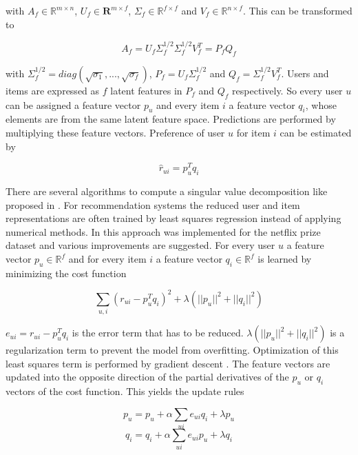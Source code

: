 \documentclass[10pt]{reportMaster}
\begin{document}
with $A_f \in \mathds{R}^{m \times n}$, $U_f \in \mathbf{R}^{m \times f}$, $\Sigma_f \in \mathds{R}^{f \times f}$ and $V_f \in \mathds{R}^{n \times f}$.
This can be transformed to 

\begin{equation}
	A_f = U_f \Sigma_f^{1/2} \Sigma_f^{1/2} V_f^T = P_f Q_f
\end{equation}

with $\Sigma_f^{1/2} = diag(\sqrt{\sigma_1}, ..., \sqrt{\sigma_f})$, $P_f = U_f \Sigma_f^{1/2}$ and $Q_f = \Sigma_f^{1/2} V_f^T$.
Users and items are expressed as $f$ latent features in $P_f$ and $Q_f$ respectively.
So every user $u$ can be assigned a feature vector $p_u$ and every item $i$ a feature vector $q_i$, whose elements are from the same latent feature space.
Predictions are performed by multiplying these feature vectors.
Preference of user $u$ for item $i$ can be estimated by 

\begin{equation}
	\hat{r}_{ui} = p_u^T q_i
\end{equation}


There are several algorithms to compute a singular value decomposition like proposed in \cite{svdGolubSolution}.
For recommendation systems the reduced user and item representations are often trained by least squares regression instead of applying numerical methods.
In \cite{matrixFactorizationDifRegParam} this approach was implemented for the netflix prize dataset and various improvements are suggested.
For every user $u$ a feature vector $p_u \in \mathds{R}^f$ and for every item $i$ a feature vector $q_i \in \mathds{R}^f$ is learned by minimizing the cost function 

\begin{equation}
	\sum_{u, i}{(r_{ui} - p_u^T q_i)^2 + \lambda (||p_u||^2 + ||q_i||^2)}
\end{equation}

$e_{ui} = r_{ui} - p_u^T q_i$ is the error term that has to be reduced.
$\lambda (||p_u||^2 + ||q_i||^2)$ is a regularization term to prevent the model from overfitting.
Optimization of this least squares term is performed by gradient descent \cite{ngRegressionLectureNotes}.
The feature vectors are updated into the opposite direction of the partial derivatives of the $p_u$ or $q_i$ vectors of the cost function.
This yields the update rules

\begin{equation}
\label{eq:updateLinRegP}
	p_u = p_u + \alpha \sum_{ui}{e_{ui} q_i + \lambda p_u}
\end{equation}
\begin{equation}
\label{eq:updateLinRegQ}
	q_i = q_i + \alpha \sum_{ui}{e_{ui} p_u + \lambda q_i}
\end{equation}
\end{document}
